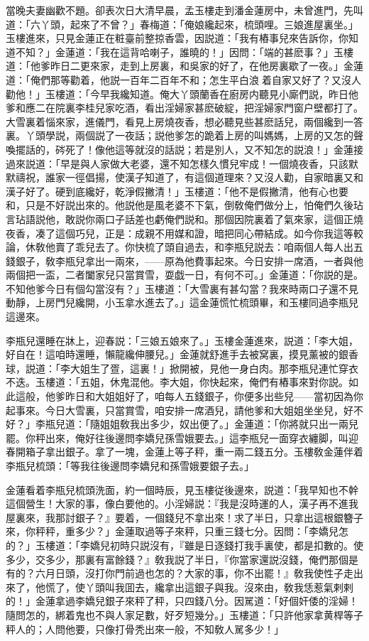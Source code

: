 當晚夫妻幽歡不題。卻表次日大清早晨，孟玉樓走到潘金蓮房中，未曾進門，先叫道：「六丫頭，起來了不曾？」春梅道：「俺娘纔起來，梳頭哩。三娘進屋裏坐。」玉樓進來，只見金蓮正在粧臺前整掠香雲，因説道：「我有樁事兒來告訴你，你知道不知？」金蓮道：「我在這背哈喇子，誰曉的！」因問：「端的甚麽事？」玉樓道：「他爹昨日二更來家，走到上房裏，和吳家的好了，在他房裏歇了一夜。」金蓮道：「俺們那等勸着，他説一百年二百年不和；怎生平白浪𢵞着自家又好了？又沒人勸他！」玉樓道：「今早我纔知道。俺大丫頭蘭香在廚房内聽見小廝們説，昨日他爹和應二在院裏李桂兒家吃酒，看出淫婦家甚麽破綻，把淫婦家門窗户壁都打了。大雪裏着惱來家，進儀門，看見上房燒夜香，想必聽見些甚麽話兒，兩個纔到一答裏。丫頭學説，兩個説了一夜話；説他爹怎的跪着上房的叫媽媽，上房的又怎的聲喚擺話的，硶死了！像他這等就沒的話説；若是別人，又不知怎的説浪！」金蓮接過來説道：「早是與人家做大老婆，還不知怎樣久慣兒牢成！一個燒夜香，只該默默禱祝，誰家一徑倡揚，使漢子知道了，有這個道理來？又沒人勸，自家暗裏又和漢子好了。硬到底纔好，乾淨假撇清！」玉樓道：「他不是假撇清，他有心也要和，只是不好説出來的。他説他是風老婆不下氣，倒敎俺們做分上，怕俺們久後玷言玷語説他，敢説你兩口子話差也虧俺們説和。那個因院裏着了氣來家，這個正燒夜香，凑了這個巧兒，正是：成親不用媒和證，暗把同心帶結成。如今你我這等較論，休敎他賣了乖兒去了。你快梳了頭自過去，和李瓶兒説去：咱兩個人每人出五錢銀子，敎李瓶兒拿出一兩來，——原為他費事起來。今日安排一席酒，一者與他兩個把一盃，二者闔家兒只當賞雪，耍戯一日，有何不可。」金蓮道：「你説的是。不知他爹今日有個勾當沒有？」玉樓道：「大雪裏有甚勾當？我來時兩口子還不見動靜，上房門兒纔開，小玉拿水進去了。」這金蓮慌忙梳頭畢，和玉樓同過李瓶兒這邊來。

李瓶兒還睡在牀上，迎春説：「三娘五娘來了。」玉樓金蓮進來，説道：「李大姐，好自在！這咱時還睡，懶龍纔伸腰兒。」金蓮就舒進手去被窝裏，摸見薰被的銀香球，説道：「李大姐生了疍，這裏！」掀開被，見他一身白肉。那李瓶兒連忙穿衣不迭。玉樓道：「五姐，休鬼混他。李大姐，你快起來，俺們有樁事來對你説。如此這般，他爹昨日和大姐姐好了，咱每人五錢銀子，你便多出些兒——當初因為你起事來。今日大雪裏，只當賞雪，咱安排一席酒兒，請他爹和大姐姐坐坐兒，好不好？」李瓶兒道：「隨姐姐敎我出多少，奴出便了。」金蓮道：「你將就只出一兩兒罷。你秤出來，俺好往後邊問李嬌兒孫雪娥要去。」這李瓶兒一面穿衣纏脚，叫迎春開箱子拿出銀子。拿了一塊，金蓮上等子秤，重一兩二錢五分。玉樓敎金蓮伴着李瓶兒梳頭：「等我往後邊問李嬌兒和孫雪娥要銀子去。」

金蓮看着李瓶兒梳頭洗面，約一個時辰，見玉樓従後邊來，説道：「我早知也不幹這個營生！大家的事，像白要他的。小淫婦説：『我是沒時運的人，漢子再不進我屋裏來，我那討銀子？』要着，一個錢兒不拿出來！求了半日，只拿出這根銀簪子來，你秤秤，重多少？」金蓮取過等子來秤，只重三錢七分。因問：「李嬌兒怎的？」玉樓道：「李嬌兒初時只説沒有，『雖是日逐錢打我手裏使，都是扣數的。使多少，交多少，那裏有富餘錢？』敎我説了半日，『你當家還説沒錢，俺們那個是有的？六月日頭，沒打你門前過也怎的？大家的事，你不出罷！』敎我使性子走出來了，他慌了，使丫頭叫我囬去，纔拿出這銀子與我。沒來由，敎我恁惹氣剌剌的！」金蓮拿過李嬌兒銀子來秤了秤，只四錢八分。因駡道：「好個奸倭的淫婦！隨問怎的，綁着鬼也不與人家足數，好歹短幾分。」玉樓道：「只許他家拿黄桿等子秤人的；人問他要，只像打骨秃出來一般，不知敎人駡多少！」

